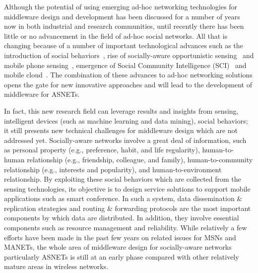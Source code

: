 Although the potential of using emerging ad-hoc networking technologies for middleware design and development has been discussed for a number of years now in both industrial and research communities, until recently there has been little or no advancement in the field of ad-hoc social networks. All that is changing because of a number of important technological advances such as the introduction of social behaviors~\cite{FXia2013}, rise of socially-aware opportunistic sensing~\cite{HJohnson2011} and mobile phone sensing~\cite{NDLane2010}, emergence of Social Community Intelligence (SCI)~\cite{DZhang2012} and mobile cloud~\cite{NFernando2013}. The combination of these advances to ad-hoc networking solutions opens the gate for new innovative approaches and will lead to the development of middleware for ASNETs.

In fact, this new research field can leverage results and insights from sensing, intelligent devices (such as machine learning and data mining), social behaviors; it still presents new technical challenges for middleware design which are not addressed yet. Socially-aware networks involve a great deal of information, such as personal property (e.g., preference, habit, and life regularity), human-to-human relationship (e.g., friendship, colleague, and family), human-to-community relationship (e.g., interests and popularity), and human-to-environment relationship. By exploiting these social behaviors which are collected from the sensing technologies, its objective is to design service solutions to support mobile applications such as smart conference. In such a system, data dissemination \& replication strategies and routing \& forwarding protocols are the most important components by which data are distributed. In addition, they involve essential components such as resource management and reliability. While relatively a few efforts have been made in the past few years on related issues for MSNs and MANETs, the whole area of middleware design for socially-aware networks particularly ASNETs is still at an early phase compared with other relatively mature areas in wireless networks.

